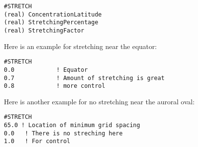 \begin{verbatim}
#STRETCH
(real) ConcentrationLatitude 
(real) StretchingPercentage 
(real) StretchingFactor  
\end{verbatim}

Here is an example for stretching near the equator:

\begin{verbatim}
#STRETCH
0.0            ! Equator
0.7            ! Amount of stretching is great
0.8            ! more control
\end{verbatim}

Here is another example for no stretching near the auroral oval:

\begin{verbatim}
#STRETCH
65.0 ! Location of minimum grid spacing
0.0	  ! There is no streching here
1.0   ! For control
\end{verbatim}